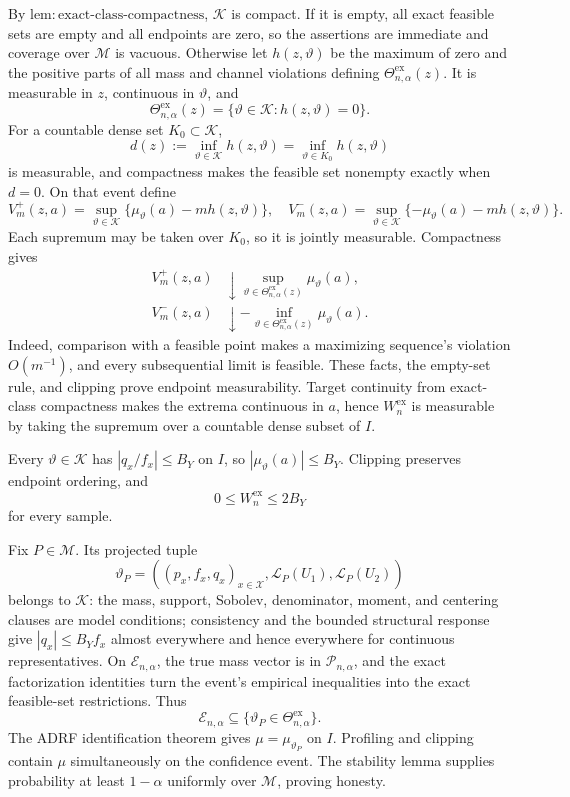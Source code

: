 By \(\mathrm{lem{:}exact\text{-}class\text{-}compactness}\), \(\mathscr K\) is compact. If it is empty, all exact feasible sets are empty and all endpoints are zero, so the assertions are immediate and coverage over \(\mathcal M\) is vacuous. Otherwise let \(h(z,\vartheta)\) be the maximum of zero and the positive parts of all mass and channel violations defining \(\Theta^{\mathrm{ex}}_{n,\alpha}(z)\). It is measurable in \(z\), continuous in \(\vartheta\), and
\[
 \Theta^{\mathrm{ex}}_{n,\alpha}(z)=\{\vartheta\in\mathscr K:h(z,\vartheta)=0\}.
\]
For a countable dense set \(K_0\subset\mathscr K\),
\[
 d(z):=\inf_{\vartheta\in\mathscr K}h(z,\vartheta)
 =\inf_{\vartheta\in K_0}h(z,\vartheta)
\]
is measurable, and compactness makes the feasible set nonempty exactly when \(d=0\). On that event define
\[
 V_m^+(z,a)=\sup_{\vartheta\in\mathscr K}\{\mu_\vartheta(a)-mh(z,\vartheta)\},
 \quad
 V_m^-(z,a)=\sup_{\vartheta\in\mathscr K}\{-\mu_\vartheta(a)-mh(z,\vartheta)\}.
\]
Each supremum may be taken over \(K_0\), so it is jointly measurable. Compactness gives
\[
 \begin{aligned}
 V_m^+(z,a)&\downarrow\sup_{\vartheta\in\Theta^{\mathrm{ex}}_{n,\alpha}(z)}\mu_\vartheta(a),\\
 V_m^-(z,a)&\downarrow-\inf_{\vartheta\in\Theta^{\mathrm{ex}}_{n,\alpha}(z)}\mu_\vartheta(a).
 \end{aligned}
\]
Indeed, comparison with a feasible point makes a maximizing sequence's violation \(O(m^{-1})\), and every subsequential limit is feasible. These facts, the empty-set rule, and clipping prove endpoint measurability. Target continuity from exact-class compactness makes the extrema continuous in \(a\), hence \(W_n^{\mathrm{ex}}\) is measurable by taking the supremum over a countable dense subset of \(I\).

Every \(\vartheta\in\mathscr K\) has \(|q_x/f_x|\le B_Y\) on \(I\), so \(|\mu_\vartheta(a)|\le B_Y\). Clipping preserves endpoint ordering, and
\[
 0\le W_n^{\mathrm{ex}}\le2B_Y
\]
for every sample.

Fix \(P\in\mathcal M\). Its projected tuple
\[
 \vartheta_P=((p_x,f_x,q_x)_{x\in\mathcal X},\mathcal L_P(U_1),\mathcal L_P(U_2))
\]
belongs to \(\mathscr K\): the mass, support, Sobolev, denominator, moment, and centering clauses are model conditions; consistency and the bounded structural response give \(|q_x|\le B_Yf_x\) almost everywhere and hence everywhere for continuous representatives. On \(\mathcal E_{n,\alpha}\), the true mass vector is in \(\mathcal P_{n,\alpha}\), and the exact factorization identities turn the event's empirical inequalities into the exact feasible-set restrictions. Thus
\[
 \mathcal E_{n,\alpha}\subseteq\{\vartheta_P\in\Theta^{\mathrm{ex}}_{n,\alpha}\}.
\]
The ADRF identification theorem gives \(\mu=\mu_{\vartheta_P}\) on \(I\). Profiling and clipping contain \(\mu\) simultaneously on the confidence event. The stability lemma supplies probability at least \(1-\alpha\) uniformly over \(\mathcal M\), proving honesty.

